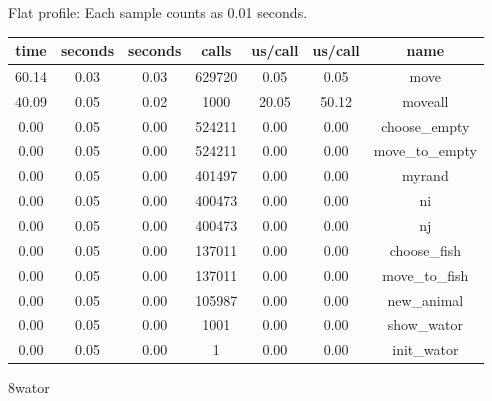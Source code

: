 \documentclass[a4paper,10pt]{article}
\begin{document}
Flat profile:
Each sample counts as 0.01 seconds.
\begin{center}
  \begin{tabular}{| c | c | c | c | c | c | c |}
    \hline
 time &   seconds &   seconds &    calls &  us/call &   us/call &   name \\ \hline    
 60.14 &      0.03 &     0.03 &   629720 &     0.05 &      0.05 &   move \\ \hline
 40.09 &      0.05 &     0.02 &     1000 &    20.05 &     50.12 &   moveall \\ \hline
  0.00 &      0.05 &     0.00 &   524211 &     0.00 &      0.00 &   choose\_empty \\ \hline
  0.00 &      0.05 &     0.00 &   524211 &     0.00 &      0.00 &   move\_to\_empty \\ \hline
  0.00 &      0.05 &     0.00 &   401497 &     0.00 &      0.00 &   myrand \\ \hline
  0.00 &      0.05 &     0.00 &   400473 &     0.00 &      0.00 &   ni \\ \hline
  0.00 &      0.05 &     0.00 &   400473 &     0.00 &      0.00 &   nj \\ \hline
  0.00 &      0.05 &     0.00 &   137011 &     0.00 &      0.00 &   choose\_fish \\ \hline
  0.00 &      0.05 &     0.00 &   137011 &     0.00 &      0.00 &   move\_to\_fish \\ \hline
  0.00 &      0.05 &     0.00 &   105987 &     0.00 &      0.00 &   new\_animal \\ \hline
  0.00 &      0.05 &     0.00 &     1001 &     0.00 &      0.00 &   show\_wator \\ \hline
  0.00 &      0.05 &     0.00 &        1 &     0.00 &      0.00 &   init\_wator \\ \hline
  \end{tabular}
\end{center}


8wator
\end{document}
